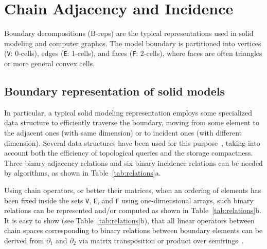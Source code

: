 \section{Chain Adjacency and Incidence}
\label{chain-adjacencies-and-incidensies}

Boundary decompositions (B-reps) are the typical representations used in solid modeling and computer graphcs. The model boundary is partitioned into vertices (\texttt{V}: 0-cells), edges (\texttt{E}: 1-cells), and faces (\texttt{F}: 2-cells), where faces are often triangles or more general convex cells. 

\subsection{Boundary representation of solid models}
\label{boundary-representation-of-solid-models}


In particular, a typical solid modeling representation employs some specialized data structure to efficiently traverse the boundary, moving from some element to the adjacent ones (with same dimension) or to incident ones (with different dimension). Several data structures have been used for this purpose~\cite{HofShapiro:2017}, taking into account both the efficiency of topological queries and the storage compactness. Three binary adjacency relations and six binary incidence relations can be needed by algorithms, as shown in Table~\ref{tab:relations}a.

Using chain operators, or better their matrices, when an ordering of elements has been fixed inside the sets \texttt{V}, \texttt{E}, and \texttt{F} using one-dimensional arrays, such binary relations can be represented and/or computed as shown in Table~\ref{tab:relations}b. It is easy to show (see Table~\ref{tab:relations}b), that all linear operators between chain spaces corresponding to binary relations between boundary elements can  be derived from $\partial_1$ and $\partial_2$ via matrix transposition or product over semirings~\cite{DBLP:journals/corr/KepnerABBFGHKLM16,GraphBLAS:API:2017}.

